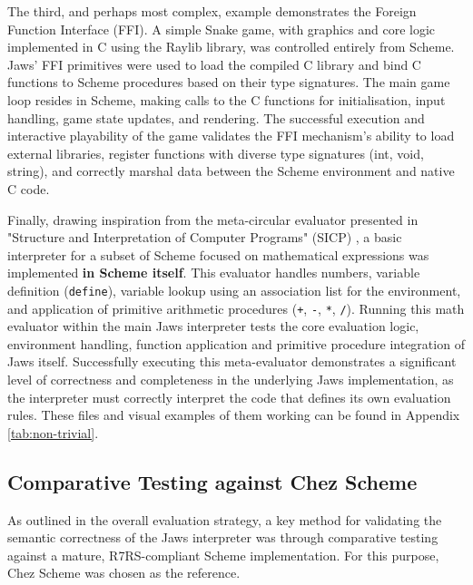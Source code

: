 \documentclass[final]{cmpreport_02}
\begin{document}
The third, and perhaps most complex, example demonstrates the Foreign Function Interface (FFI). A simple Snake game, with graphics and core logic implemented in C using the Raylib library, was controlled entirely from Scheme. Jaws' FFI primitives were used to load the compiled C library and bind C functions to Scheme procedures based on their type signatures. The main game loop resides in Scheme, making calls to the C functions for initialisation, input handling, game state updates, and rendering. The successful execution and interactive playability of the game validates the FFI mechanism's ability to load external libraries, register functions with diverse type signatures (int, void, string), and correctly marshal data between the Scheme environment and native C code.\newline

Finally, drawing inspiration from the meta-circular evaluator presented in "Structure and Interpretation of Computer Programs" (SICP) \cite{structureandinterp}, a basic interpreter for a subset of Scheme focused on mathematical expressions was implemented \textbf{in Scheme itself}. This evaluator handles numbers, variable definition (\texttt{define}), variable lookup using an association list for the environment, and application of primitive arithmetic procedures (\texttt{+}, \texttt{-}, \texttt{*}, \texttt{/}). Running this math evaluator within the main Jaws interpreter tests the core evaluation logic, environment handling, function application and primitive procedure integration of Jaws itself. Successfully executing this meta-evaluator demonstrates a significant level of correctness and completeness in the underlying Jaws implementation, as the interpreter must correctly interpret the code that defines its own evaluation rules. These files and visual examples of them working can be found in Appendix \ref{tab:non-trivial}. \newline

\subsection{Comparative Testing against Chez Scheme}

\label{sec:chez-testing}

As outlined in the overall evaluation strategy, a key method for validating the semantic correctness of the Jaws interpreter was through comparative testing against a mature, R7RS-compliant Scheme implementation. For this purpose, Chez Scheme \cite{chezscheme} was chosen as the reference.\newline
\end{document}
